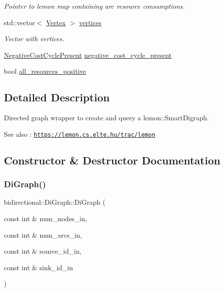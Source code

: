 \begin{DoxyCompactItemize}
\begin{DoxyCompactList}\small\item\em Pointer to lemon map containing arc resource consumptions. \end{DoxyCompactList}\item 
std\+::vector$<$ \hyperlink{structbidirectional_1_1Vertex}{Vertex} $>$ \hyperlink{classbidirectional_1_1DiGraph_ac1922b68a5f05cc890fcad5acf0b4c35}{vertices}
\begin{DoxyCompactList}\small\item\em Vector with vertices. \end{DoxyCompactList}\item 
\hyperlink{namespacebidirectional_a507ec433f8ac22a92fcc3b8aad252f29}{Negative\+Cost\+Cycle\+Present} \hyperlink{classbidirectional_1_1DiGraph_aeeadd4ac80efd524ce85763e1fd30768}{negative\+\_\+cost\+\_\+cycle\+\_\+present}
\item 
bool \hyperlink{classbidirectional_1_1DiGraph_ae31e98d4867f98174ec40f911d6be14e}{all\+\_\+resources\+\_\+positive}
\end{DoxyCompactItemize}


\subsection{Detailed Description}
Directed graph wrapper to create and query a lemon\+::\+Smart\+Digraph. \begin{DoxySeeAlso}{See also}
\+: \href{https://lemon.cs.elte.hu/trac/lemon}{\tt https\+://lemon.\+cs.\+elte.\+hu/trac/lemon} 
\end{DoxySeeAlso}


\subsection{Constructor \& Destructor Documentation}
\mbox{\label{classbidirectional_1_1DiGraph_a8c15d18a0760e40039441081aa88a51b}} 
\subsubsection{\texorpdfstring{Di\+Graph()}{DiGraph()}}
{\footnotesize\ttfamily bidirectional\+::\+Di\+Graph\+::\+Di\+Graph (\begin{DoxyParamCaption}\item[{const int \&}]{num\+\_\+nodes\+\_\+in,  }\item[{const int \&}]{num\+\_\+arcs\+\_\+in,  }\item[{const int \&}]{source\+\_\+id\+\_\+in,  }\item[{const int \&}]{sink\+\_\+id\+\_\+in }\end{DoxyParamCaption})}

